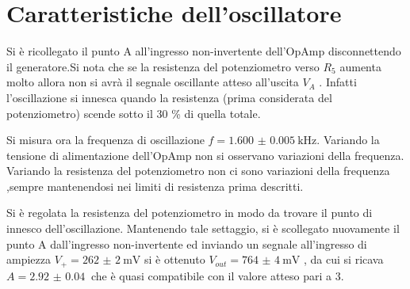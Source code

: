 \section{Caratteristiche dell'oscillatore}
Si è ricollegato il punto A all'ingresso non-invertente dell'OpAmp disconnettendo il generatore.Si nota che se la resistenza del potenziometro verso $R_5$ aumenta molto allora non si avrà il segnale oscillante atteso all'uscita $V_A$ . Infatti l'oscillazione si innesca quando la resistenza (prima considerata del potenziometro) scende sotto il 30 \% di quella totale. 

Si misura ora la frequenza di oscillazione $f= \SI{1.600(5)}{\kHz}$. Variando la tensione di alimentazione dell'OpAmp non si osservano variazioni della frequenza. Variando la resistenza del potenziometro non ci sono variazioni della frequenza ,sempre mantenendosi nei limiti di resistenza prima descritti.

Si è regolata la resistenza del potenziometro in modo da trovare il punto di innesco dell'oscillazione. Mantenendo tale settaggio, si è scollegato nuovamente il punto A dall'ingresso non-invertente ed inviando un segnale all'ingresso di ampiezza $V_+=\SI{262(2)}{\mV}$ si è ottenuto $V_{out}= \SI{764(4)}{\mV}$ , da cui si ricava $A=\SI{2.92(4)}{}$ che è quasi compatibile con il valore atteso pari a 3.